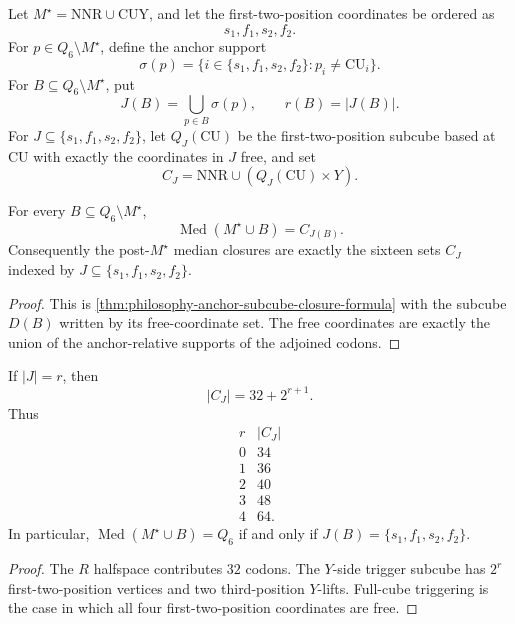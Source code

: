 \begin{definition}
\label{def:philosophy-boolean-trigger-closure}
Let $M^{\star}=\mathrm{NNR}\cup\mathrm{CUY}$, and let the first-two-position
coordinates be ordered as
$$
  s_{1},f_{1},s_{2},f_{2}.
$$
For $p\in Q_{6}\setminus M^{\star}$, define the anchor support
$$
  \sigma(p)
  =
  \{i\in\{s_{1},f_{1},s_{2},f_{2}\}:p_{i}\neq \mathrm{CU}_{i}\}.
$$
For $B\subseteq Q_{6}\setminus M^{\star}$, put
$$
  J(B)=\bigcup_{p\in B}\sigma(p),
  \qquad
  r(B)=|J(B)|.
$$
For $J\subseteq\{s_{1},f_{1},s_{2},f_{2}\}$, let $Q_{J}(\mathrm{CU})$
be the first-two-position subcube based at $\mathrm{CU}$ with exactly
the coordinates in $J$ free, and set
$$
  C_{J}=\mathrm{NNR}\cup(Q_{J}(\mathrm{CU})\times Y).
$$
\end{definition}

\begin{theorem}
\label{thm:philosophy-trigger-lattice}
For every $B\subseteq Q_{6}\setminus M^{\star}$,
$$
  \operatorname{Med}(M^{\star}\cup B)=C_{J(B)}.
$$
Consequently the post-$M^{\star}$ median closures are exactly the
sixteen sets $C_{J}$ indexed by
$J\subseteq\{s_{1},f_{1},s_{2},f_{2}\}$.
\end{theorem}
\begin{proof}
This is \autoref{thm:philosophy-anchor-subcube-closure-formula} with
the subcube $D(B)$ written by its free-coordinate set. The free
coordinates are exactly the union of the anchor-relative supports of
the adjoined codons.
\end{proof}

\begin{corollary}
\label{cor:philosophy-trigger-rank-size}
If $|J|=r$, then
$$
  |C_{J}|=32+2^{r+1}.
$$
Thus
$$
\begin{array}{c|r}
  r & |C_{J}|\\
  \hline
  0 & 34\\
  1 & 36\\
  2 & 40\\
  3 & 48\\
  4 & 64.
\end{array}
$$
In particular, $\operatorname{Med}(M^{\star}\cup B)=Q_{6}$ if and only
if $J(B)=\{s_{1},f_{1},s_{2},f_{2}\}$.
\end{corollary}
\begin{proof}
The $R$ halfspace contributes $32$ codons. The $Y$-side trigger subcube
has $2^{r}$ first-two-position vertices and two third-position
$Y$-lifts. Full-cube triggering is the case in which all four
first-two-position coordinates are free.
\end{proof}

